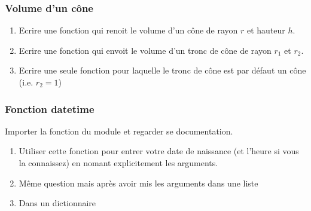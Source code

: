 \documentclass[letterpaper,10pt,english]{sphinxhowto}
\begin{document}
\subsubsection{Volume d’un cône}
\label{\detokenize{cours1_fonctions_exercices:volume-d-un-cone}}\begin{enumerate}
%
\item {} 
\sphinxAtStartPar
Ecrire une fonction qui renoit le volume d’un cône de rayon \(r\) et hauteur \(h\).

\item {} 
\sphinxAtStartPar
Ecrire une fonction qui envoit le volume d’un tronc de cône de rayon \(r_1\) et \(r_2\).

\item {} 
\sphinxAtStartPar
Ecrire une seule fonction pour laquelle le tronc de cône est par défaut un cône (i.e. \(r_2=1\))

\end{enumerate}


\subsubsection{Fonction datetime}
\label{\detokenize{cours1_fonctions_exercices:fonction-datetime}}
\sphinxAtStartPar
Importer la fonction  du module  et regarder se documentation.
\begin{enumerate}
%
\item {} 
\sphinxAtStartPar
Utiliser cette fonction pour entrer votre date de naissance (et l’heure si vous la connaissez) en nomant explicitement les arguments.

\item {} 
\sphinxAtStartPar
Même question mais après avoir mis les arguments dans une liste

\item {} 
\sphinxAtStartPar
Dans un dictionnaire

\end{enumerate}
\end{document}
